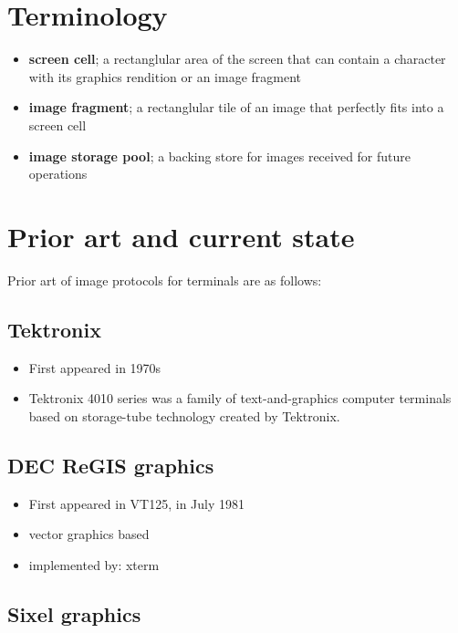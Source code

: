 \documentclass[a4paper]{article}
\begin{document}
\section{Terminology} %
\begin{itemize}
    \item \textbf{screen cell}; a rectanglular area of the screen that can contain a character with
        its graphics rendition or an image fragment
    \item \textbf{image fragment}; a rectanglular tile of an image that perfectly fits into a screen cell
    \item \textbf{image storage pool}; a backing store for images received for future operations
\end{itemize}


\section{Prior art and current state} %

Prior art of image protocols for terminals are as follows:

\subsection{Tektronix}

\begin{itemize}
    \item First appeared in 1970s
    \item Tektronix 4010 series was a family of text-and-graphics computer terminals based on storage-tube technology created by Tektronix.
\end{itemize}

\subsection{DEC ReGIS graphics}

\begin{itemize}
    \item First appeared in VT125, in July 1981
    \item vector graphics based
    \item implemented by: xterm
\end{itemize}

\subsection{Sixel graphics}
\end{document}
